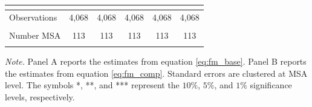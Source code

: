 \documentclass[dv_diss_main.tex]{subfiles}
\begin{document}
\begin{table}[H]
\begin{center}
{\begin{tabular}{lccccc}
    \vspace{4pt} & \begin{footnotesize}\end{footnotesize} & \begin{footnotesize}\end{footnotesize} & \begin{footnotesize}\end{footnotesize} & \begin{footnotesize}\end{footnotesize} & \begin{footnotesize}\end{footnotesize} \\
    \hline
    Observations & 4,068 & 4,068 & 4,068 & 4,068 & 4,068 \\
    \vspace{-2pt} & \vspace{-2pt} & \vspace{-2pt} & \vspace{-2pt} & \vspace{-2pt} \\
    Number MSA & 113 & 113 & 113 & 113 & 113 \\
    \vspace{-2pt} & \vspace{-2pt} & \vspace{-2pt} & \vspace{-2pt} & \vspace{-2pt} \\
    \hline
    
    \end{tabular}
    }
    \label{tab:fm_restricted}
    \end{center}
       
    \footnotesize{\textit{Note. }Panel A reports the estimates from equation \eqref{eq:fm_base}. Panel B reports the estimates from equation \eqref{eq:fm_comp}. Standard errors are clustered at MSA level. The symbols *, **, and *** represent the $10\%$, $5\%$, and $1\%$ significance levels, respectively.}
\end{table}
\end{document}
